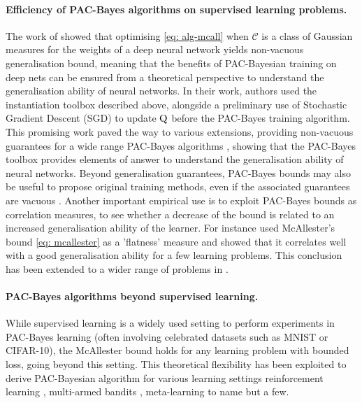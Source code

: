 \paragraph{Efficiency of PAC-Bayes algorithms on supervised learning problems.}
The work of \citet{dziugaite2017computing} showed that optimising \eqref{eq: alg-mcall} when $\mathcal{C}$ is a class of Gaussian measures for the weights of a deep neural network yields non-vacuous generalisation bound, meaning that the benefits of PAC-Bayesian training on deep nets can be ensured from a theoretical perspective to understand the generalisation ability of neural networks. In their work, authors used the instantiation toolbox described above, alongside a preliminary use of Stochastic Gradient Descent (SGD) to update $\mathrm{Q}$ before the PAC-Bayes training algorithm. This promising work paved the way to various extensions, providing non-vacuous guarantees for a wide range PAC-Bayes algorithms \citep{rivasplata2019pac,letarte2019dichotomize,perezortiz2021learning,perez2021progress,perez2021tighter,dziugaite2021role,biggs2022non,biggs2023tighter}, showing that the PAC-Bayes toolbox provides elements of answer to understand the generalisation ability of neural networks. Beyond generalisation guarantees, PAC-Bayes bounds may also be useful to propose original training methods, even if the associated guarantees are vacuous \citep{biggs2021differentiable,biggs2022margin}. Another important empirical use is to exploit PAC-Bayes bounds as correlation measures, to see whether a decrease of the bound is related to an increased generalisation ability of the learner. For instance \citet{neyshabur2017explor} used McAllester's bound \eqref{eq: mcallester} as a 'flatness' measure and showed that it correlates well with a good generalisation ability for a few learning problems. This conclusion has been extended to a wider range of problems in \citet{jiang2020fantastic,dziugaite2020search}. 
\\
\paragraph{PAC-Bayes algorithms beyond supervised learning.} While supervised learning is a widely used setting to perform experiments in PAC-Bayes learning (often involving celebrated datasets such as MNIST or CIFAR-10), the McAllester bound holds for any learning problem with bounded loss, going beyond this setting. This theoretical flexibility has been exploited to derive PAC-Bayesian algorithm for various learning settings reinforcement learning \citep{fard2010pac}, multi-armed bandits \citep{seldin2011pac,seldin2012pac,sakhi2023pac}, meta-learning \citep{amit2018meta,farid2021generalization,rothfuss2021pacoh,rothfuss2022pac,ding2021bridging} to name but a few. 
\\
